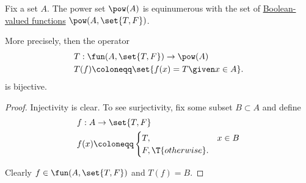 \begin{lemma}\label{thm:power_set_via_subsets}
  Fix a set \( A \). The power set \( \pow(A) \) is equinumerous with the set of \hyperref[def:boolean_function]{Boolean-valued functions} \( \pow(A, \set{ T, F }) \).

  More precisely, then the operator
  \begin{equation*}
    \begin{aligned}
      &T: \fun(A, \set{ T, F }) \to \pow(A) \\
      &T(f) \coloneqq \set{ f(x) = T \given x \in A }.
    \end{aligned}
  \end{equation*}
  is bijective.
\end{lemma}
\begin{proof}
  Injectivity is clear. To see surjectivity, fix some subset \( B \subset A \) and define
  \begin{equation*}
    \begin{aligned}
      &f: A \to \set{ T, F } \\
      &f(x) \coloneqq \begin{cases}
        T, &x \in B \\
        F, \T{otherwise}.
      \end{cases}
    \end{aligned}
  \end{equation*}

  Clearly \( f \in \fun(A, \set{ T, F }) \) and \( T(f) = B \).
\end{proof}

